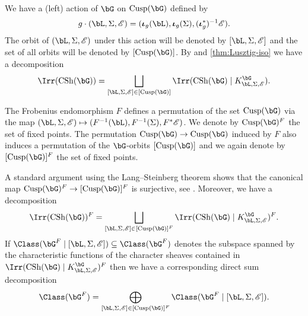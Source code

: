 \documentclass[eqthmnum,nocolour,skinny]{jt-calcs}
\DeclareMathOperator{\CS}{CSh}
\DeclareMathOperator{\Cusp}{Cusp}
\begin{document}
\begin{pa}\label{pa:induced-complex}
We have a (left) action of $\bG$ on $\Cusp(\bG)$ defined by
\begin{equation*}
g\cdot (\bL,\Sigma,\mathscr{E}) = (\boldsymbol{\iota}_g(\bL),\boldsymbol{\iota}_g(\Sigma),(\boldsymbol{\iota}_g^*)^{-1}\mathscr{E}).
\end{equation*}
The orbit of $(\bL,\Sigma,\mathscr{E})$ under this action will be denoted by $[\bL,\Sigma,\mathscr{E}]$ and the set of all orbits will be denoted by $[\Cusp(\bG)]$. By \cite[7.1.12, 7.6]{lusztig:1985:character-sheaves} and \cref{thm:Lusztig-iso} we have a decomposition
\begin{equation*}
\Irr(\CS(\bG)) = \bigsqcup_{[\bL,\Sigma,\mathscr{E}] \in [\Cusp(\bG)]} \Irr(\CS(\bG) \mid K_{\bL,\Sigma,\mathscr{E}}^{\bG}).
\end{equation*}
\end{pa}

\begin{pa}
The Frobenius endomorphism $F$ defines a permutation of the set $\Cusp(\bG)$ via the map $(\bL,\Sigma,\mathscr{E}) \mapsto (F^{-1}(\bL),F^{-1}(\Sigma),F^*\mathscr{E})$. We denote by $\Cusp(\bG)^F$ the set of fixed points. The permutation $\Cusp(\bG) \to \Cusp(\bG)$ induced by $F$ also induces a permutation of the $\bG$-orbits $[\Cusp(\bG)]$ and we again denote by $[\Cusp(\bG)]^F$ the set of fixed points.
\end{pa}

\begin{pa}
A standard argument using the Lang--Steinberg theorem shows that the canonical map $\Cusp(\bG)^F \to [\Cusp(\bG)]^F$ is surjective, see \cite[10.5]{lusztig:1985:character-sheaves}. Moreover, we have a decomposition
\begin{equation*}
\Irr(\CS(\bG))^F = \bigsqcup_{[\bL,\Sigma,\mathscr{E}] \in [\Cusp(\bG)]^F} \Irr(\CS(\bG) \mid K_{\bL,\Sigma,\mathscr{E}}^{\bG})^F.
\end{equation*}
If $\Class(\bG^F \mid [\bL,\Sigma,\mathscr{E}]) \subseteq \Class(\bG^F)$ denotes the subspace spanned by the characteristic functions of the character sheaves contained in $\Irr(\CS(\bG) \mid K_{\bL,\Sigma,\mathscr{E}}^{\bG})^F$ then we have a corresponding direct sum decomposition
\begin{equation*}
\Class(\bG^F) = \bigoplus_{[\bL,\Sigma,\mathscr{E}] \in [\Cusp(\bG)]^F} \Class(\bG^F \mid [\bL,\Sigma,\mathscr{E}]).
\end{equation*}
\end{pa}
\end{document}
